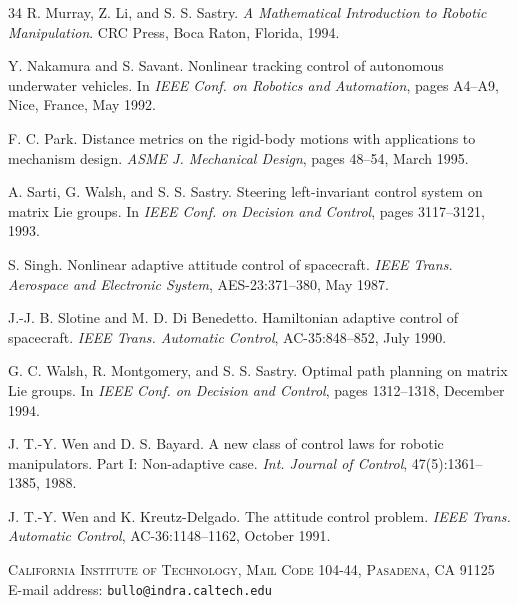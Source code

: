 \documentclass[11pt]{article}
\begin{document}
\begin{thebibliography}{34}
 R. Murray, Z. Li, and S. S. Sastry. \emph{A Mathematical Introduction to Robotic Manipulation}. CRC Press, Boca Raton, Florida, 1994.

 Y. Nakamura and S. Savant. Nonlinear tracking control of autonomous underwater vehicles. In \emph{IEEE Conf. on Robotics and Automation}, pages A4--A9, Nice, France, May 1992.

 F. C. Park. Distance metrics on the rigid-body motions with applications to mechanism design. \emph{ASME J. Mechanical Design}, pages 48--54, March 1995.

 A. Sarti, G. Walsh, and S. S. Sastry. Steering left-invariant control system on matrix Lie groups. In \emph{IEEE Conf. on Decision and Control}, pages 3117--3121, 1993.

 S. Singh. Nonlinear adaptive attitude control of spacecraft. \emph{IEEE Trans. Aerospace and Electronic System}, AES-23:371--380, May 1987.

 J.-J. B. Slotine and M. D. Di Benedetto. Hamiltonian adaptive control of spacecraft. \emph{IEEE Trans. Automatic Control}, AC-35:848--852, July 1990.

 G. C. Walsh, R. Montgomery, and S. S. Sastry. Optimal path planning on matrix Lie groups. In \emph{IEEE Conf. on Decision and Control}, pages 1312--1318, December 1994.

 J. T.-Y. Wen and D. S. Bayard. A new class of control laws for robotic manipulators. Part I: Non-adaptive case. \emph{Int. Journal of Control}, 47(5):1361--1385, 1988.

 J. T.-Y. Wen and K. Kreutz-Delgado. The attitude control problem. \emph{IEEE Trans. Automatic Control}, AC-36:1148--1162, October 1991.
\end{thebibliography}

\bigskip
\noindent\textsc{California Institute of Technology, Mail Code 104-44, Pasadena, CA 91125}\\
\noindent E-mail address: \texttt{bullo@indra.caltech.edu}
\end{document}
